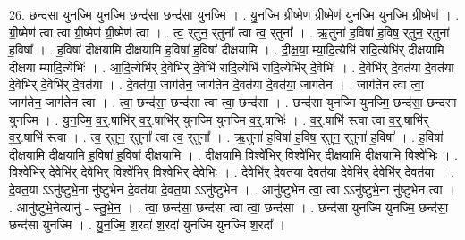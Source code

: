 \documentclass[17pt]{extarticle}
\begin{document}
26. छन्द॑सा युनज्मि युनज्मि॒ छन्द॑सा॒ छन्द॑सा युनज्मि । . यु॒न॒ज्मि॒ ग्री॒ष्मेण॑ ग्री॒ष्मेण॑ युनज्मि युनज्मि ग्री॒ष्मेण॑ । . ग्री॒ष्मेण॑ त्वा त्वा ग्री॒ष्मेण॑ ग्री॒ष्मेण॑ त्वा । . त्व॒ र्‌तुन॒ र्‌तुना᳚ त्वा त्व॒ र्‌तुना᳚ । . ऋ॒तुना॑ ह॒विषा॑ ह॒विष॒ र्‌तुन॒ र्‌तुना॑ ह॒विषा᳚ । . ह॒विषा॑ दीक्षयामि दीक्षयामि ह॒विषा॑ ह॒विषा॑ दीक्षयामि । . दी॒क्ष॒या॒ म्या॒दि॒त्येभि॑ रादि॒त्येभि॑र् दीक्षयामि दीक्षया म्यादि॒त्येभिः॑ । . आ॒दि॒त्येभि॑र् दे॒वेभि॑र् दे॒वेभि॑ रादि॒त्येभि॑ रादि॒त्येभि॑र् दे॒वेभिः॑ । . दे॒वेभि॑र् दे॒वत॑या दे॒वत॑या दे॒वेभि॑र् दे॒वेभि॑र् दे॒वत॑या । . दे॒वत॑या॒ जाग॑तेन॒ जाग॑तेन दे॒वत॑या दे॒वत॑या॒ जाग॑तेन । . जाग॑तेन त्वा त्वा॒ जाग॑तेन॒ जाग॑तेन त्वा । . त्वा॒ छन्द॑सा॒ छन्द॑सा त्वा त्वा॒ छन्द॑सा । . छन्द॑सा युनज्मि युनज्मि॒ छन्द॑सा॒ छन्द॑सा युनज्मि । . यु॒न॒ज्मि॒ व॒र्॒.षाभि॑र् व॒र्॒.षाभि॑र् युनज्मि युनज्मि व॒र्॒.षाभिः॑ । . व॒र्॒.षाभि॑ स्त्वा त्वा व॒र्॒.षाभि॑र् व॒र्॒.षाभि॑ स्त्वा । . त्व॒ र्‌तुन॒ र्‌तुना᳚ त्वा त्व॒ र्‌तुना᳚ । . ऋ॒तुना॑ ह॒विषा॑ ह॒विष॒ र्‌तुन॒ र्‌तुना॑ ह॒विषा᳚ । . ह॒विषा॑ दीक्षयामि दीक्षयामि ह॒विषा॑ ह॒विषा॑ दीक्षयामि । . दी॒क्ष॒या॒मि॒ विश्वे॑भि॒र् विश्वे॑भिर् दीक्षयामि दीक्षयामि॒ विश्वे॑भिः । . विश्वे॑भिर् दे॒वेभि॑र् दे॒वेभि॒र् विश्वे॑भि॒र् विश्वे॑भिर् दे॒वेभिः॑ । . दे॒वेभि॑र् दे॒वत॑या दे॒वत॑या दे॒वेभि॑र् दे॒वेभि॑र् दे॒वत॑या । . दे॒वत॒या ऽऽनु॑ष्टुभे॒ना नु॑ष्टुभेन दे॒वत॑या दे॒वत॒या ऽऽनु॑ष्टुभेन । . आनु॑ष्टुभेन त्वा॒ त्वा ऽऽनु॑ष्टुभे॒ना नु॑ष्टुभेन त्वा । . आनु॑ष्टुभे॒नेत्यानु॑ - स्तु॒भे॒न॒ । . त्वा॒ छन्द॑सा॒ छन्द॑सा त्वा त्वा॒ छन्द॑सा । . छन्द॑सा युनज्मि युनज्मि॒ छन्द॑सा॒ छन्द॑सा युनज्मि । . यु॒न॒ज्मि॒ श॒रदा॑ श॒रदा॑ युनज्मि युनज्मि श॒रदा᳚ । \newline
\end{document}
